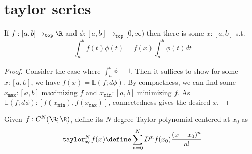 \documentclass[10pt]{scrartcl}
\newcommand{\E}{\mathbb E}
\newcommand{\cattop}{\mathtt{top}}
\numberwithin{thms}{section}
\begin{document}
\section{taylor series}
\newcommand{\taylor}{\mathtt{taylor}}
\begin{lemma}
  \label{mvt-int}
  If $f:[a,b]\to_\cattop\R$ and $\phi:[a,b]\to_\cattop[0,\infty)$ then there is some $x:[a,b]$ s.t.
  \[
  \int_a^bf(t)\phi(t)=f(x)\int_a^b\phi(t)dt
  \]
  \cite{wiki:mvt-int}
\end{lemma}
\begin{proof}
  Consider the case where $\int_a^b\phi=1$. Then it suffices to show for some $x:[a,b]$, we have $f(x)=\E(f;d\phi)$. By compactness, we can find some 
  \newcommand{\xmax}{x_{\mathtt{max}}}
  \newcommand{\xmin}{x_{\mathtt{min}}}
  $\xmax:[a,b]$ maximizing $f$ and $\xmin:[a,b]$ minimizing $f$. As $\E(f;d\phi):[f(\xmin),f(\xmax)]$, connectedness gives the desired $x$. 
\end{proof}

\begin{defn}
  Given $f:C^N(\R;\R)$, define its $N$-degree Taylor polynomial centered at $x_0$ as
  \[
  \taylor_{x_0}^Nf(x)\define\sum_{n=0}^N D^nf(x_0) \frac{(x-x_0)^n}{n!}
  \]
\end{defn}

  
\end{document}
